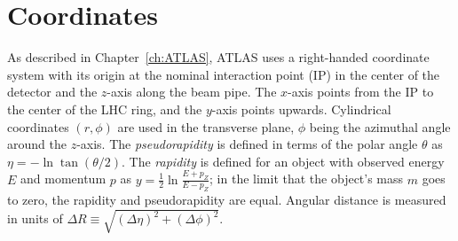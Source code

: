 \section{Coordinates}
As described in Chapter~\ref{ch:ATLAS}, ATLAS uses a right-handed coordinate system with its origin at the nominal interaction point (IP)
in the center of the detector and the \(z\)-axis along the beam pipe.
The \(x\)-axis points from the IP to the center of the LHC ring,
and the \(y\)-axis points upwards.
Cylindrical coordinates \((r,\phi)\) are used in the transverse plane,
\(\phi\) being the azimuthal angle around the \(z\)-axis.
The \textit{pseudorapidity} is defined in terms of the polar angle \(\theta\) as \(\eta = -\ln \tan(\theta/2)\).
The \textit{rapidity} is defined for an object with observed energy $E$ and momentum $p$ as \(y = \frac{1}{2}\ln\frac{E+p_Z}{E-p_Z}\); in the limit that the object's mass $m$ goes to zero, the rapidity and pseudorapidity are equal.
Angular distance is measured in units of \(\Delta R \equiv \sqrt{(\Delta\eta)^{2} + (\Delta\phi)^{2}}\).

